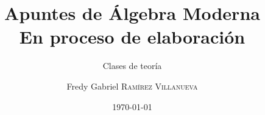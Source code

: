 \documentclass[a4paper, 12pt]{report}
\institute{Universidad Nacional de Asunción}
\title{Apuntes de Álgebra Moderna\\{\large En proceso de elaboración}}
\subtitle{Clases de teoría}
\author{Fredy Gabriel \textsc{Ramírez Villanueva}}
\date{\today}
\begin{document}
    \maketitle
    \tableofcontents

	
	
	
    

    \newpage

    \nocite{*}
    \printbibliography

    \newpage

    \appendix
\end{document}
